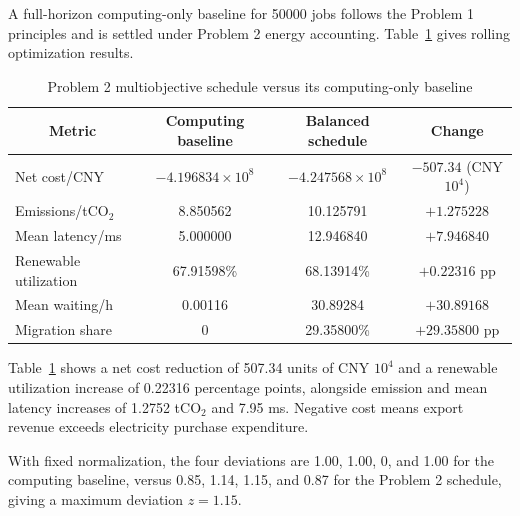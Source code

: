 A full-horizon computing-only baseline for 50000 jobs follows the Problem 1 principles and is settled under Problem 2 energy accounting. Table~\ref{tab:q2_result} gives rolling optimization results.

\begin{table}[H]
	\centering
    \caption{Problem 2 multiobjective schedule versus its computing-only baseline}
	\label{tab:q2_result}

	\fontsize{10.5pt}{12pt}\selectfont
	\renewcommand{\arraystretch}{0.90}

	\begin{tabular}{lccc}
		\toprule
        \multicolumn{1}{c}{\textbf{Metric}}
        & \textbf{Computing baseline}
        & \textbf{Balanced schedule}
        & \textbf{Change}\\
		\midrule

        Net cost/CNY
		& $-4.196834\times10^8$
		& $-4.247568\times10^8$
        & $-507.34$ (CNY $10^4$)\\

        Emissions/tCO$_2$
		& 8.850562
		& 10.125791
        & $+1.275228$\\

        Mean latency/ms
		& 5.000000
		& 12.946840
        & $+7.946840$\\

        Renewable utilization
		& 67.91598\%
		& 68.13914\%
        & $+0.22316$ pp\\

        Mean waiting/h
		& 0.00116
		& 30.89284
        & $+30.89168$\\

        Migration share
		& 0
		& 29.35800\%
        & $+29.35800$ pp\\

		\bottomrule
	\end{tabular}
\end{table}


Table~\ref{tab:q2_result} shows a net cost reduction of 507.34 units of CNY $10^4$ and a renewable utilization increase of 0.22316 percentage points, alongside emission and mean latency increases of 1.2752 tCO$_2$ and 7.95 ms. Negative cost means export revenue exceeds electricity purchase expenditure.

With fixed normalization, the four deviations are 1.00, 1.00, 0, and 1.00 for the computing baseline, versus 0.85, 1.14, 1.15, and 0.87 for the Problem 2 schedule, giving a maximum deviation $z=1.15$.

